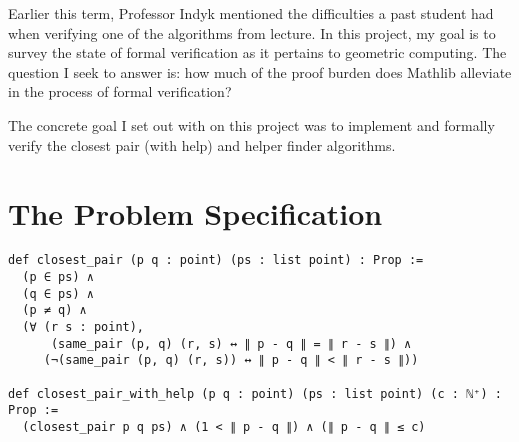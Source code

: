 \documentclass{article}
\begin{document}



Earlier this term, Professor Indyk mentioned the difficulties a past student had when verifying one of the algorithms from lecture.
In this project, my goal is to survey the state of formal verification as it pertains to geometric computing.
The question I seek to answer is: how much of the proof burden does Mathlib alleviate in the process of formal verification?


The concrete goal I set out with on this project was to implement and formally verify the closest pair (with help) and helper finder algorithms.

\section{The Problem Specification}

\begin{verbatim}
def closest_pair (p q : point) (ps : list point) : Prop :=
  (p ∈ ps) ∧
  (q ∈ ps) ∧
  (p ≠ q) ∧
  (∀ (r s : point),
      (same_pair (p, q) (r, s) ↔ ∥ p - q ∥ = ∥ r - s ∥) ∧
     (¬(same_pair (p, q) (r, s)) ↔ ∥ p - q ∥ < ∥ r - s ∥))

def closest_pair_with_help (p q : point) (ps : list point) (c : ℕ⁺) : Prop :=
  (closest_pair p q ps) ∧ (1 < ∥ p - q ∥) ∧ (∥ p - q ∥ ≤ c)
\end{verbatim}
\newpage
\end{document}
